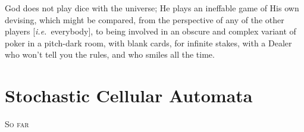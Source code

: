 
\begin{savequote}[99mm]
God does not play dice with the universe; He plays an ineffable game of His own devising, which might be compared, from the perspective of any of the other players [{\it i.e.}\ everybody], to being involved in an obscure and complex variant of poker in a pitch-dark room, with blank cards, for infinite stakes, with a Dealer who won't tell you the rules, and who smiles all the time.
\end{savequote}

\chapter{Stochastic Cellular Automata}

\lettrine[lines=5, loversize=-0.1, lraise=0.1]{S}{o far} 

